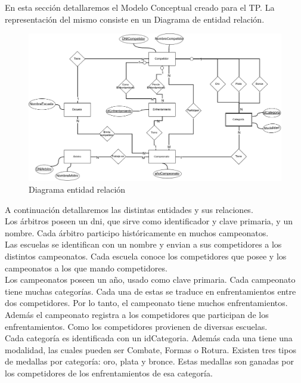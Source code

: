 En esta sección detallaremos el Modelo Conceptual creado para el TP. La representación del mismo consiste en un Diagrama
de entidad relación.

\begin{figure}[H]
  \centering
    \includegraphics[scale=0.4]{imagenes/DER.png}
  \caption{Diagrama entidad relación}
\end{figure}

A continuación detallaremos las distintas entidades y sus relaciones.\\

Los árbitros poseen un dni, que sirve como identificador y clave primaria, y un nombre. Cada árbitro participo históricamente
en muchos campeonatos.\\

Las escuelas se identifican con un nombre y envian a sus competidores a los distintos campeonatos. Cada escuela conoce los competidores
que posee y los campeonatos a los que mando competidores.\\

Los campeonatos poseen un año, usado como clave primaria. Cada campeonato tiene muchas categorías. Cada una de estas se
traduce en enfrentamientos entre dos competidores. Por lo tanto, el campeonato tiene muchos enfrentamientos. Además
el campeonato registra a los competidores que participan de los enfrentamientos. Como los competidores provienen de
diversas escuelas.\\

Cada categoría es identificada con un idCategoria. Además cada una tiene una modalidad, las cuales pueden ser
Combate, Formas o Rotura. Existen tres tipos de medallas por categoría: oro, plata y bronce. Estas medallas son ganadas
por los competidores de los enfrentamientos de esa categoría.\\

